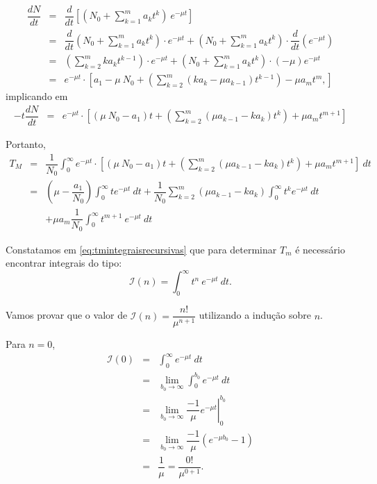 {\[\begin{array}{rcl}
\dfrac{dN}{dt}
&=& \dfrac{d}{dt}\left[\left(N_0+\displaystyle\sum_{k=1}^{m} a_{k} t^{k}\right)\ e^{-\mu t}\right] \\
&=& \dfrac{d}{dt}\left(N_0+\displaystyle\sum_{k=1}^{m} a_{k} t^{k}\right) \cdot e^{-\mu t} + \left(N_0+\displaystyle\sum_{k=1}^{m} a_{k} t^{k}\right) \cdot \dfrac{d}{dt}\left(e^{-\mu t}\right) \\
&=& \left(\displaystyle\sum_{k=2}^{m} k a_{k} t^{k-1}\right) \cdot e^{-\mu t} + \left(N_0+\displaystyle\sum_{k=1}^{m} a_{k} t^{k}\right) \cdot (-\mu) e^{-\mu t} \\
&=& e^{-\mu t} \cdot \left[
a_1-\mu\ N_0 + \left(\displaystyle\sum_{k=2}^{m} (k a_{k}-\mu a_{k-1}) t^{k-1}\right) - \mu a_m t^m,
\right]
\end{array}\]
implicando em
\[\begin{array}{rcl}
-t \dfrac{dN}{dt}
&=& e^{-\mu t} \cdot \left[
(\mu\ N_0-a_1) t + \left(\displaystyle\sum_{k=2}^{m} (\mu a_{k-1}-k a_{k}) t^{k}\right) + \mu a_m t^{m+1}\right]
\end{array}\]

Portanto,
\begin{eqnarray}
\nonumber
T_M
&=& \dfrac{1}{N_0} \displaystyle\int_{0}^{\infty} 
e^{-\mu t} \cdot \left[
(\mu\ N_0-a_1) t + \left(\displaystyle\sum_{k=2}^{m} (\mu a_{k-1}-k a_{k}) t^{k}\right) + \mu a_m t^{m+1}\right]
\ dt
\\ \nonumber
&=& 
\left(\mu -\dfrac{a_1}{N_0}\right) \displaystyle\int_{0}^{\infty} t e^{-\mu t}\ dt +
\dfrac{1}{N_0} \displaystyle\sum_{k=2}^{m} (\mu a_{k-1}-k a_{k}) \int_{0}^{\infty} t^{k} e^{-\mu t}\ dt \\ \label{eq:tmintegraisrecursivas}
&& +
\mu a_m \dfrac{1}{N_0}\displaystyle\int_{0}^{\infty} t^{m+1}\ e^{-\mu t}\ dt
\end{eqnarray}

Constatamos em \eqref{eq:tmintegraisrecursivas} que para determinar \(T_m\) é necessário encontrar integrais do tipo:
\begin{equation}\label{eq:integralIn}
\mathcal{I}(n) = \displaystyle\int_{0}^{\infty} t^{n}\ e^{-\mu t}\ dt. 
\end{equation}

Vamos provar que o valor de \(\mathcal{I}(n) = \dfrac{n!}{\mu^{n+1}}\) utilizando a indução sobre \(n\).

Para \(n=0\),
\begin{eqnarray}
\nonumber
\mathcal{I}(0)
&=& \displaystyle\int_{0}^{\infty} e^{-\mu t}\ dt \\ \nonumber
&=& \lim_{b_0 \to \infty} \displaystyle\int_{0}^{b_0} e^{-\mu t}\ dt \\ \nonumber
&=& \lim_{b_0 \to \infty}  \left.\dfrac{-1}{\mu} e^{-\mu t}\right|_{0}^{b_0} \\ \nonumber
&=& \lim_{b_0 \to \infty}  \dfrac{-1}{\mu} \left(e^{-\mu b_0} -1 \right) \\
\label{eq:resoltado_zero}
&=& \dfrac{1}{\mu} = \dfrac{0!}{\mu^{0+1}}.
\end{eqnarray}

}
